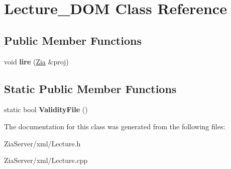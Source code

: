 \hypertarget{class_lecture___d_o_m}{
\section{Lecture\_\-DOM Class Reference}
\label{class_lecture___d_o_m}
}
\subsection*{Public Member Functions}
\begin{DoxyCompactItemize}
\item 
\hypertarget{class_lecture___d_o_m_a384f1b6e1813a352cfc2bcb06714decd}{
void {\bfseries lire} (\hyperlink{class_zia}{Zia} \&proj)}
\label{class_lecture___d_o_m_a384f1b6e1813a352cfc2bcb06714decd}

\end{DoxyCompactItemize}
\subsection*{Static Public Member Functions}
\begin{DoxyCompactItemize}
\item 
\hypertarget{class_lecture___d_o_m_a0ab8e2bbaf8acdf19fc6d04984af1027}{
static bool {\bfseries ValidityFile} ()}
\label{class_lecture___d_o_m_a0ab8e2bbaf8acdf19fc6d04984af1027}

\end{DoxyCompactItemize}


The documentation for this class was generated from the following files:\begin{DoxyCompactItemize}
\item 
ZiaServer/xml/Lecture.h\item 
ZiaServer/xml/Lecture.cpp\end{DoxyCompactItemize}
